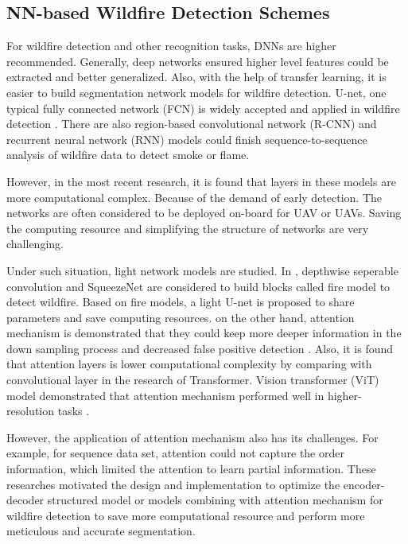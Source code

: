 \subsection{NN-based Wildfire Detection Schemes}
For wildfire detection and other recognition tasks, DNNs are higher recommended. Generally, deep networks ensured higher level features could be extracted and better generalized. Also, with the help of transfer learning, it is easier to build segmentation network models for wildfire detection. U-net, one typical fully connected network (FCN) is widely accepted and applied in wildfire detection \cite{li2019detection, park2020wildfire, he2016deep, huang2017densely, mommert2020characterization}. There are also region-based convolutional network (R-CNN) \cite{lee2019deep} and recurrent neural network (RNN) \cite{jeong2020light} models could finish sequence-to-sequence analysis of wildfire data to detect smoke or flame.\par
However, in the most recent research, it is found that layers in these models are more computational complex. Because of the demand of early detection. The networks are often considered to be deployed on-board for UAV or UAVs. Saving the computing resource and simplifying the structure of networks are very challenging.\par 
Under such situation, light network models are studied. In \cite{peng2019real}, depthwise seperable convolution and SqueezeNet are considered to build blocks called fire model to detect wildfire. Based on fire models, a light U-net is proposed \cite{zhang2021att} to share parameters and save computing resources. on the other hand, attention mechanism is demonstrated that they could keep more deeper information in the down sampling process and decreased false positive detection \cite{oktay2018attention}. Also, it is found that attention layers is lower computational complexity by comparing with convolutional layer \cite{vaswani2017attention} in the research of Transformer. Vision transformer (ViT) model demonstrated that attention mechanism performed well in higher-resolution tasks \cite{zhang2018image}.\par
However, the application of attention mechanism also has its challenges. For example, for sequence data set, attention could not capture the order information, which limited the attention to learn partial information. These researches motivated the design and implementation to optimize the encoder-decoder structured model or models combining with attention mechanism for wildfire detection to save more computational resource and perform more meticulous and accurate segmentation.
